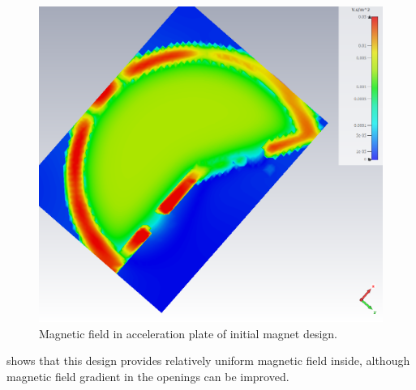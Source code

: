 \documentclass[a4paper,oneside,12pt]{report}
\numberwithin{equation}{chapter}
\begin{document}
\begin{figure}[H]
    \centering
    \captionsetup{justification=centering}
    \includegraphics[width=.8\linewidth]{./figures/cst/cst_first_magnet_design3.png}
    \caption{Magnetic field in acceleration plate of initial magnet design.}
    \label{fig:initial_magnet_design_B}
\end{figure}
 shows that this design provides relatively uniform magnetic field inside, although magnetic field gradient in the openings can be improved. 
\end{document}
